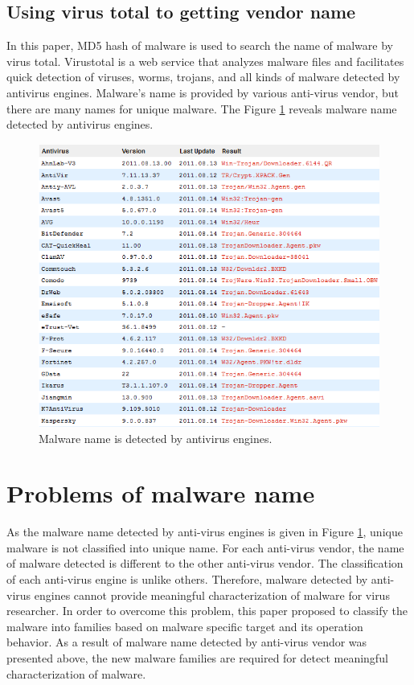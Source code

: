 \subsection{Using virus total to getting vendor name}
In this paper, MD5 hash of malware is used to search the name of malware by virus total. Virustotal is a web service that analyzes malware files and facilitates quick detection of viruses, worms, trojans, and all kinds of malware detected by antivirus engines. Malware's name is provided by various anti-virus vendor, but there are many names for unique malware. The Figure \ref{fig:virustotal_listname} reveals malware name detected by antivirus engines. 
\begin{figure}[h!]
\centering
\includegraphics[width=1.0\textwidth]{graph/virustotal_listname.png}
\caption{Malware name is detected by antivirus engines.}
\label{fig:virustotal_listname}
\end{figure}
\section{Problems of malware name} 
As the malware name detected by anti-virus engines is given in Figure \ref{fig:virustotal_listname}, unique malware is not classified into unique name. For each anti-virus vendor, the name of malware detected is different to the other anti-virus vendor. The classification of each anti-virus engine is unlike others. Therefore, malware detected by anti-virus engines cannot provide meaningful characterization of malware for virus researcher. In order to overcome this problem, this paper proposed to classify the malware into families based on malware specific target and its operation behavior. 
As a result of malware name detected by anti-virus vendor was presented above, the new malware families are required for detect meaningful characterization of malware. 
